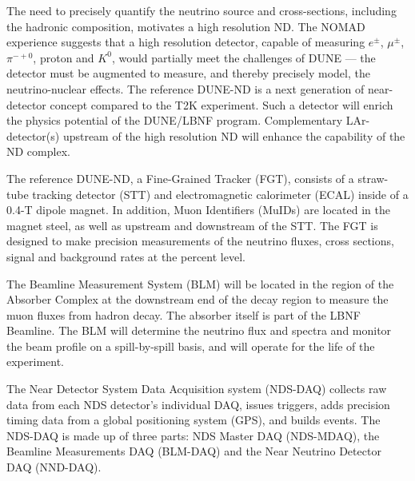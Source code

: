 The need to precisely quantify the neutrino source and
cross-sections, including the hadronic composition, motivates
a high resolution ND. The NOMAD experience suggests that a high
resolution detector, capable of measuring $e^{\pm}$, $\mu^{\pm}$,
$\pi^{-+0}$, proton and $K^{0}$, would partially meet the
challenges of DUNE --- the detector must be augmented to measure, and
thereby precisely model, the neutrino-nuclear effects. The reference
DUNE-ND is a next generation of near-detector concept
compared to the T2K experiment. Such a detector will
enrich the physics potential of the DUNE/LBNF program.  Complementary
LAr-detector(s) upstream of the high resolution ND will enhance the
capability of the ND complex.


The reference DUNE-ND, a Fine-Grained Tracker (FGT),
consists of a straw-tube tracking detector (STT) and electromagnetic
calorimeter (ECAL) inside of a 0.4-T dipole magnet. In addition, Muon
Identifiers (MuIDs) are located in the magnet steel, as well as
upstream and downstream of the STT. The FGT is designed to make
precision measurements of the neutrino fluxes, cross sections, signal
and background rates at the percent level.

The Beamline Measurement System (BLM) will be located in the region of
the Absorber Complex at the downstream end of the decay region to
measure the muon fluxes from hadron decay. The absorber itself is part
of the LBNF Beamline.  The BLM will determine the neutrino
flux and spectra and monitor the beam profile on a spill-by-spill
basis, and will operate for the life of the experiment.

The Near Detector System Data Acquisition system (NDS-DAQ) collects
raw data from each NDS detector's individual DAQ, issues triggers,
adds precision timing data from a global positioning system (GPS), and
builds events.  The NDS-DAQ is made up of three parts: NDS Master DAQ
(NDS-MDAQ), the Beamline Measurements DAQ (BLM-DAQ) and the Near
Neutrino Detector DAQ (NND-DAQ).
